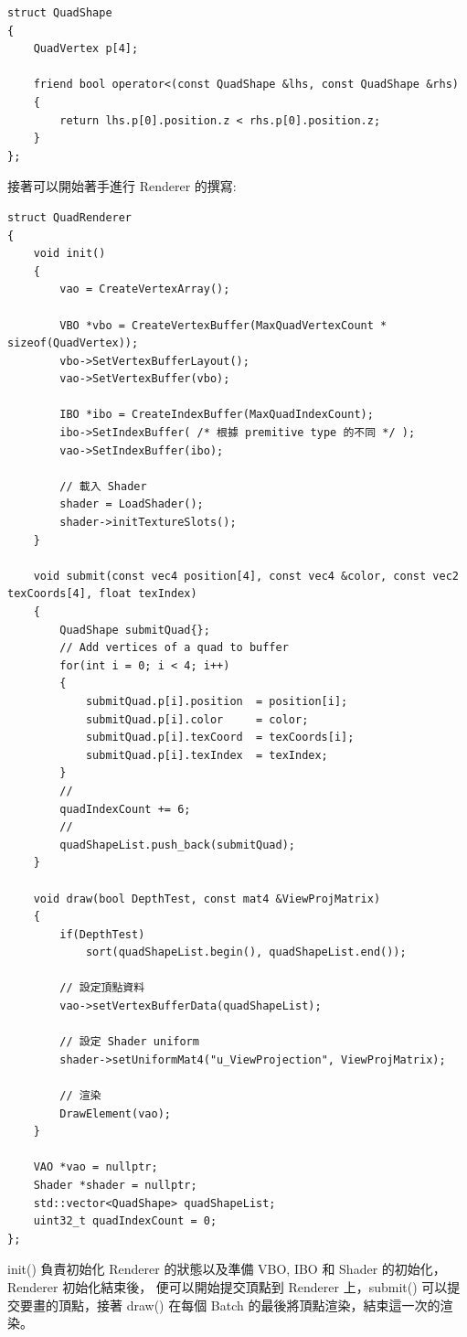 \begin{lstlisting}
struct QuadShape
{
    QuadVertex p[4];

    friend bool operator<(const QuadShape &lhs, const QuadShape &rhs)
    {
        return lhs.p[0].position.z < rhs.p[0].position.z;
    }
};
\end{lstlisting}

接著可以開始著手進行 Renderer 的撰寫:

\begin{lstlisting}
struct QuadRenderer
{
    void init()
    {
        vao = CreateVertexArray();
        
        VBO *vbo = CreateVertexBuffer(MaxQuadVertexCount * sizeof(QuadVertex));
        vbo->SetVertexBufferLayout();
        vao->SetVertexBuffer(vbo);
        
        IBO *ibo = CreateIndexBuffer(MaxQuadIndexCount);
        ibo->SetIndexBuffer( /* 根據 premitive type 的不同 */ );
        vao->SetIndexBuffer(ibo);
        
        // 載入 Shader
        shader = LoadShader();
        shader->initTextureSlots();
    }
    
    void submit(const vec4 position[4], const vec4 &color, const vec2 texCoords[4], float texIndex)
    {
        QuadShape submitQuad{};
        // Add vertices of a quad to buffer
        for(int i = 0; i < 4; i++)
        {
            submitQuad.p[i].position  = position[i];
            submitQuad.p[i].color     = color;
            submitQuad.p[i].texCoord  = texCoords[i];
            submitQuad.p[i].texIndex  = texIndex;
        }
        //
        quadIndexCount += 6;
        //
        quadShapeList.push_back(submitQuad);
    }
    
    void draw(bool DepthTest, const mat4 &ViewProjMatrix)
    {
        if(DepthTest)
            sort(quadShapeList.begin(), quadShapeList.end());
            
        // 設定頂點資料
        vao->setVertexBufferData(quadShapeList);
        
        // 設定 Shader uniform
        shader->setUniformMat4("u_ViewProjection", ViewProjMatrix);
        
        // 渲染
        DrawElement(vao);
    }
    
    VAO *vao = nullptr;
    Shader *shader = nullptr;
    std::vector<QuadShape> quadShapeList;
    uint32_t quadIndexCount = 0;
};
\end{lstlisting}

init() 負責初始化 Renderer 的狀態以及準備 VBO, IBO 和 Shader 的初始化，Renderer 初始化結束後，
便可以開始提交頂點到 Renderer 上，submit() 可以提交要畫的頂點，接著 draw() 在每個 Batch 的最後將頂點渲染，結束這一次的渲染。

